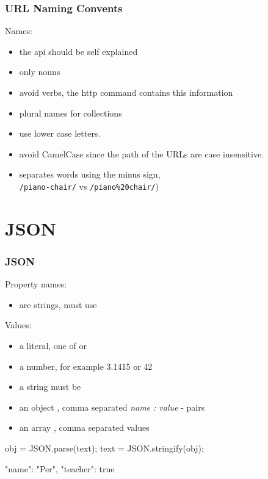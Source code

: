 \begin{frame}[fragile]
\frametitle{URL Naming Convents}
\color{structure}
\noindent Names:
\begin{itemize}\color{structure}
  \item the api should be self explained
  \item only nouns
  \item avoid verbs, the http command contains this information
  \item plural names for collections
  \item use lower case letters.
  \item avoid CamelCase since the path of the URLs are case insensitive.
  \item separates words using the minus sign,\\  \texttt{/piano-chair/} vs \texttt{/piano\%20chair/})
\end{itemize}
\end{frame}

\section{JSON}
\begin{frame}[fragile]\frametitle{JSON}
Property names:
\begin{itemize}
  \item  are strings, must use 
\end{itemize}
Values:
\begin{itemize}
  \item  a literal, one of  or 
  \item  a number, for example 3.1415 or 42
  \item  a string must be 
  \item  an object \code{\{\}}, comma separated \emph{name : value} - pairs
  \item  an array \code{[]}, comma separated values
\end{itemize}
\begin{CodeBox}{}
obj = JSON.parse(text);
text = JSON.stringify(obj);
\end{CodeBox}
\begin{CodeBox}{}
{"name": "Per", "teacher": true }
\end{CodeBox}
\end{frame}


